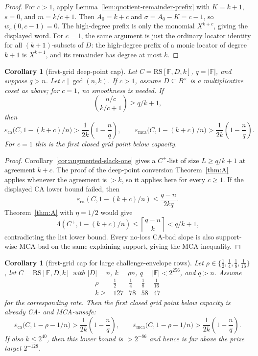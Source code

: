 \documentclass[11pt]{article}
\newtheorem{corollary}[theorem]{Corollary}
\theoremstyle{definition}
\theoremstyle{remark}
\newcommand{\F}{\mathbb{F}}
\newcommand{\B}{B}
\newcommand{\RS}{\mathrm{RS}}
\newcommand{\eca}{\varepsilon_{\mathrm{ca}}}
\newcommand{\emca}{\varepsilon_{\mathrm{mca}}}
\newcommand{\Lst}{\Lambda}
\begin{document}
\begin{proof}
For $c>1$, apply Lemma~\ref{lem:quotient-remainder-prefix} with $K=k+1$,
$s=0$, and $m=k/c+1$.  Then $A_0=k+c$ and $\sigma=A_0-K=c-1$, so
$w_c(0,c-1)=0$.  The high-degree prefix is only the monomial $X^{k+c}$, giving
the displayed word.  For $c=1$, the same argument is just the ordinary locator
identity for all $(k+1)$-subsets of $D$: the high-degree prefix of a monic
locator of degree $k+1$ is $X^{k+1}$, and its remainder has degree at most $k$.
\end{proof}

\begin{corollary}[first-grid deep-point cap]
\label{cor:first-grid-cap}
Let $C=\RS[\F,D,k]$, $q=|\F|$, and suppose $q>n$.  Let
$c\mid\gcd(n,k)$.  If $c>1$, assume $D\subseteq\B^\times$ is a
multiplicative coset as above; for $c=1$, no smoothness is needed.  If
\[
        \binom{n/c}{k/c+1}\ge q/k+1,
\]
then
\[
        \eca\bigl(C,1-(k+c)/n\bigr)
        >\frac1{2k}\left(1-\frac nq\right),
        \qquad
        \emca\bigl(C,1-(k+c)/n\bigr)
        >\frac1{2k}\left(1-\frac nq\right).
\]
For $c=1$ this is the first closed grid point below capacity.
\end{corollary}

\begin{proof}
Corollary~\ref{cor:augmented-slack-one} gives a $C^+$-list of size
$L\ge q/k+1$ at agreement $k+c$.  The proof of the deep-point conversion
Theorem~\ref{thm:A} applies whenever the agreement is $>k$, so it applies here
for every $c\ge1$.  If the displayed CA lower bound failed, then
\[
        \eca(C,1-(k+c)/n)\le \frac{q-n}{2kq}.
\]
Theorem~\ref{thm:A} with $\eta=1/2$ would give
\[
        \Lst(C^+,1-(k+c)/n)
        \le
        \left\lceil \frac{q-n}{k}\right\rceil
        < q/k+1,
\]
contradicting the list lower bound.  Every no-loss CA-bad slope is also
support-wise MCA-bad on the same explaining support, giving the MCA inequality.
\end{proof}

\begin{corollary}[first-grid cap for large challenge-envelope rows]
\label{cor:first-grid-grand}
Let $\rho\in\{\frac12,\frac14,\frac18,\frac1{16}\}$, let
$C=\RS[\F,D,k]$ with $|D|=n$, $k=\rho n$, $q=|\F|<2^{256}$, and
$q>n$.  Assume
\[
\begin{array}{c|cccc}
\rho & \frac12 & \frac14 & \frac18 & \frac1{16}\\ \hline
k\ge & 127 & 78 & 58 & 47
\end{array}
\]
for the corresponding rate.  Then the first closed grid point below capacity is
already CA- and MCA-unsafe:
\[
        \eca\bigl(C,1-\rho-1/n\bigr)
        >\frac1{2k}\left(1-\frac nq\right),
        \qquad
        \emca\bigl(C,1-\rho-1/n\bigr)
        >\frac1{2k}\left(1-\frac nq\right).
\]
If also $k\le2^{40}$, then this lower bound is $>2^{-86}$ and hence is far
above the prize target $2^{-128}$.
\end{corollary}
\end{document}
